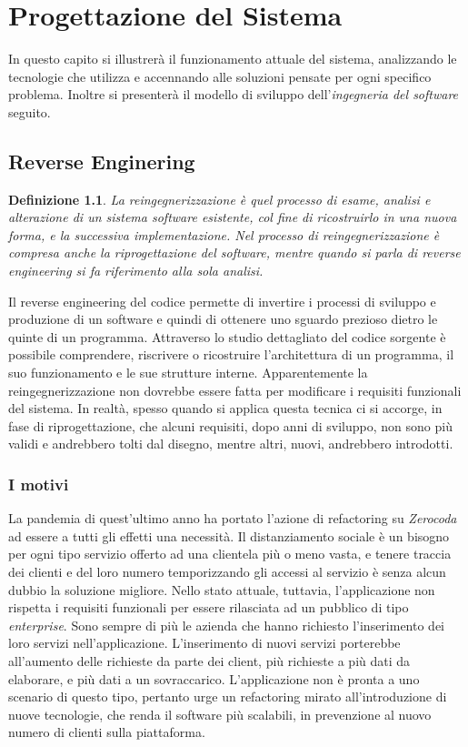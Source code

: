 \chapter{Progettazione del Sistema}
\label{chap:systemdesign}
In questo capito si illustrerà il funzionamento attuale del sistema, analizzando le tecnologie che utilizza e accennando alle soluzioni pensate per ogni specifico problema. Inoltre si presenterà il modello di sviluppo dell'\emph{ingegneria del software} seguito.

\section{Reverse Enginering}
\newtheorem*{def:reverseengineering}{Definizione}
\begin{def:reverseengineering}
    La reingegnerizzazione è quel processo di esame, analisi e alterazione di un sistema software esistente, col fine di ricostruirlo in una nuova forma, e la successiva implementazione. \cite{chikofsky:reverseengineering} Nel processo di reingegnerizzazione è compresa anche la riprogettazione del software, mentre quando si parla di reverse engineering si fa riferimento alla sola analisi.
\end{def:reverseengineering}
Il reverse engineering del codice permette di invertire i processi di sviluppo e produzione di un software e quindi di ottenere uno sguardo prezioso dietro le quinte di un programma. Attraverso lo studio dettagliato del codice sorgente è possibile comprendere, riscrivere o ricostruire l’architettura di un programma, il suo funzionamento e le sue strutture interne. Apparentemente la reingegnerizzazione non dovrebbe essere fatta per modificare i requisiti funzionali del sistema. In realtà, spesso quando si applica questa tecnica ci si accorge, in fase di riprogettazione, che alcuni requisiti, dopo anni di sviluppo, non sono più validi e andrebbero tolti dal disegno, mentre altri, nuovi, andrebbero introdotti.

\subsection{I motivi}
La pandemia di quest'ultimo anno ha portato l'azione di refactoring su \emph{Zerocoda} ad essere a tutti gli effetti una necessità. Il distanziamento sociale è un bisogno per ogni tipo servizio offerto ad una clientela più o meno vasta, e tenere traccia dei clienti e del loro numero temporizzando gli accessi al servizio è senza alcun dubbio la soluzione migliore. Nello stato attuale, tuttavia, l'applicazione non rispetta i requisiti funzionali per essere rilasciata ad un pubblico di tipo \emph{enterprise}. Sono sempre di più le azienda che hanno richiesto l'inserimento dei loro servizi nell'applicazione. L'inserimento di nuovi servizi porterebbe all'aumento delle richieste da parte dei client, più richieste a più dati da elaborare, e più dati a un sovraccarico. L'applicazione non è pronta a uno scenario di questo tipo, pertanto urge un refactoring mirato all'introduzione di nuove tecnologie, che renda il software più scalabili, in prevenzione al nuovo numero di clienti sulla piattaforma.

